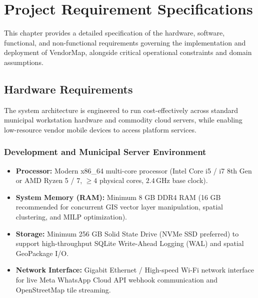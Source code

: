 \chapter{Project Requirement Specifications}
\label{ch:requirements}

This chapter provides a detailed specification of the hardware, software, functional, and non-functional requirements governing the implementation and deployment of VendorMap, alongside critical operational constraints and domain assumptions.

\section{Hardware Requirements}
\label{sec:hardware_requirements}

The system architecture is engineered to run cost-effectively across standard municipal workstation hardware and commodity cloud servers, while enabling low-resource vendor mobile devices to access platform services.

\subsection{Development and Municipal Server Environment}
\begin{itemize}
    \item \textbf{Processor:} Modern x86\_64 multi-core processor (Intel Core i5 / i7 8th Gen or AMD Ryzen 5 / 7, $\ge 4$ physical cores, $2.4\,\text{GHz}$ base clock).
    \item \textbf{System Memory (RAM):} Minimum 8 GB DDR4 RAM (16 GB recommended for concurrent GIS vector layer manipulation, spatial clustering, and MILP optimization).
    \item \textbf{Storage:} Minimum 256 GB Solid State Drive (NVMe SSD preferred) to support high-throughput SQLite Write-Ahead Logging (WAL) and spatial GeoPackage I/O.
    \item \textbf{Network Interface:} Gigabit Ethernet / High-speed Wi-Fi network interface for live Meta WhatsApp Cloud API webhook communication and OpenStreetMap tile streaming.
\end{itemize}

